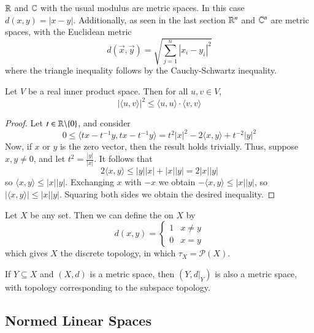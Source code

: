 \begin{example}
    $\mathbb R$ and $\mathbb C$ with the usual modulus are metric spaces. In this case $d(x,y) = |x-y|$. Additionally, as seen in the last section $\mathbb R^n$ and $\mathbb C^n$ are metric spaces, with the Euclidean metric $$d(\vec{x},\vec{y}) = \sqrt{\sum_{j=1}^n|x_i - y_i|^2}$$ where the triangle inequality follows by the Cauchy-Schwartz inequality.
\end{example}

\begin{proposition}
    Let $V$ be a real inner product space. Then for all $u,v \in V$, $$|\langle u,v\rangle|^2 \leq \langle u,u\rangle \cdot\langle v,v\rangle$$
\end{proposition}
\begin{proof}
    Let $t \in \mathbb R\backslash\{0\}$, and consider $$0\leq \langle tx-t^{-1}y,tx-t^{-1}y\rangle = t^2|x|^2 - 2\langle x,y\rangle + t^{-2}|y|^2$$ Now, if $x$ or $y$ is the zero vector, then the result holds trivially. Thus, suppose $x,y\neq 0$, and let $t^2 = \frac{|y|}{|x|}$. It follows that $$2\langle x,y\rangle \leq |y||x| + |x||y| = 2|x||y|$$ so $\langle x,y\rangle \leq |x||y|$. Exchanging $x$ with $-x$ we obtain $-\langle x,y\rangle \leq |x||y|$, so $|\langle x,y\rangle| \leq |x||y|$. Squaring both sides we obtain the desired inequality.
\end{proof}


\begin{example}
    Let $X$ be any set. Then we can define the  on $X$ by $$d(x,y) = \left\{\begin{array}{cc} 1 & x\neq y\\ 0 & x=y \end{array}\right.$$ which gives $X$ the discrete topology, in which $\tau_X = \mathcal{P}(X)$.
\end{example}

\begin{example}
    If $Y \subseteq X$ and $(X,d)$ is a metric space, then $(Y,d\vert_Y)$ is also a metric space, with topology corresponding to the subspace topology.
\end{example}


\subsection{Normed Linear Spaces}

